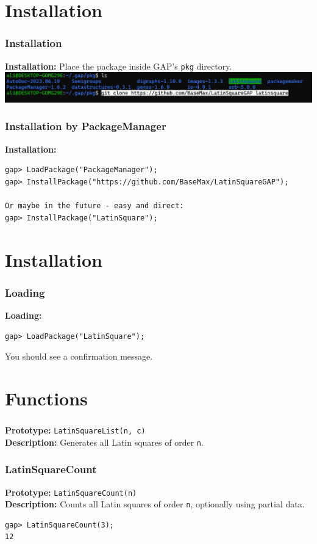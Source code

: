 \documentclass{beamer}
\begin{document}
\section{Installation}
\begin{frame}[fragile]
\frametitle{Installation}
\textbf{Installation:}  
Place the package inside GAP's \texttt{pkg} directory.\\
\includegraphics[width=1\textwidth]{img19}\\
\end{frame}


\begin{frame}[fragile]
\frametitle{Installation by PackageManager}
\textbf{Installation:}
\begin{lstlisting}
gap> LoadPackage("PackageManager");
gap> InstallPackage("https://github.com/BaseMax/LatinSquareGAP");

Or maybe in the future - easy and direct:
gap> InstallPackage("LatinSquare");
\end{lstlisting}
\end{frame}


\section{Installation}
\begin{frame}[fragile]
\frametitle{Loading}
\textbf{Loading:}
\begin{lstlisting}
gap> LoadPackage("LatinSquare");
\end{lstlisting}
You should see a confirmation message.
\end{frame}

\section{Functions}
\begin{frame}[fragile]
\frametitle{}
\textbf{Prototype:} \texttt{LatinSquareList(n, c)}\\
\textbf{Description:} Generates all Latin squares of order \texttt{n}.
\end{frame}

\begin{frame}[fragile]
\frametitle{LatinSquareCount}
\textbf{Prototype:} \texttt{LatinSquareCount(n)}\\
\textbf{Description:} Counts all Latin squares of order \texttt{n}, optionally using partial data.
\begin{lstlisting}
gap> LatinSquareCount(3);
12
\end{lstlisting}
\end{frame}
\end{document}
